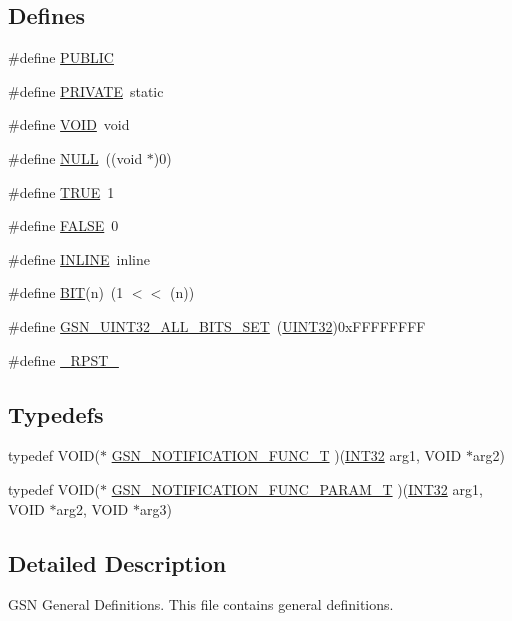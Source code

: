 \subsection*{Defines}
\begin{DoxyCompactItemize}
\item 
\#define \hyperlink{a00481_ad17d551e31d1828c68acf40684849b7e}{PUBLIC}
\item 
\#define \hyperlink{a00481_a5e151c615eda34903514212f05a5ccf8}{PRIVATE}~static
\item 
\#define \hyperlink{a00481_a7f319bfc2492a2136964194204e7a8cf}{VOID}~void
\item 
\#define \hyperlink{a00481_a070d2ce7b6bb7e5c05602aa8c308d0c4}{NULL}~((void $\ast$)0)
\item 
\#define \hyperlink{a00481_aa8cecfc5c5c054d2875c03e77b7be15d}{TRUE}~1
\item 
\#define \hyperlink{a00481_aa93f0eb578d23995850d61f7d61c55c1}{FALSE}~0
\item 
\#define \hyperlink{a00481_a2eb6f9e0395b47b8d5e3eeae4fe0c116}{INLINE}~inline
\item 
\#define \hyperlink{a00481_a3a8ea58898cb58fc96013383d39f482c}{BIT}(n)~(1 $<$$<$ (n))
\item 
\#define \hyperlink{a00481_a95a6e741e0101f45a10465dc193ee94b}{GSN\_\-UINT32\_\-ALL\_\-BITS\_\-SET}~(\hyperlink{a00660_gae1e6edbbc26d6fbc71a90190d0266018}{UINT32})0xFFFFFFFF
\item 
\#define \hyperlink{a00481_aba1bb1f0fe70a61bd05f77183661e394}{\_\-RPST\_\-}
\end{DoxyCompactItemize}
\subsection*{Typedefs}
\begin{DoxyCompactItemize}
\item 
typedef VOID($\ast$ \hyperlink{a00481_aac7371fae4e423f90332caf551b62cf1}{GSN\_\-NOTIFICATION\_\-FUNC\_\-T} )(\hyperlink{a00660_ga63021d67d54286c2163bcdb43a6f2569}{INT32} arg1, VOID $\ast$arg2)
\item 
typedef VOID($\ast$ \hyperlink{a00481_ade5de35fdb0758ec8628e62ed56bc533}{GSN\_\-NOTIFICATION\_\-FUNC\_\-PARAM\_\-T} )(\hyperlink{a00660_ga63021d67d54286c2163bcdb43a6f2569}{INT32} arg1, VOID $\ast$arg2, VOID $\ast$arg3)
\end{DoxyCompactItemize}


\subsection{Detailed Description}
GSN General Definitions. This file contains general definitions. 

